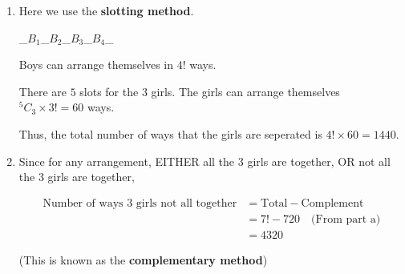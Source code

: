 \documentclass[11pt,a4paper]{book}
\begin{document}
\begin{example}
\begin{enumerate}[label=(\alph*)]
\item  Here we use the \textbf{slotting method}.

\_$B_{1}$\_$B_{2}$\_$B_{3}$\_$B_{4}$\_

Boys can arrange themselves in $4!$ ways.

There are $5$ slots for the $3$ girls. The girls can arrange themselves
$^{5}C_{3}\times3!=60$ ways.

Thus, the total number of ways that the girls are seperated is $4!\times60=1440$.

\item  Since for any arrangement, EITHER all the 3 girls are together,
OR not all the 3 girls are together,

\begin{align*}
\text{Number of ways 3 girls not all together} & =\text{Total}-\text{Complement}\\
 & =7!-720\quad\text{(From part a)}\\
 & =4320
\end{align*}

(This is known as the \textbf{complementary method})

\end{enumerate}

\end{example}

\newpage
\end{document}
